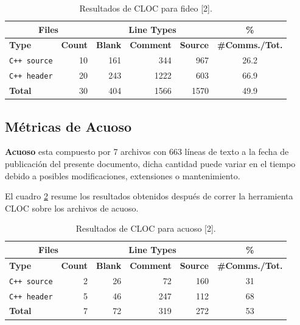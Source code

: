 \begin{table}[!htf]
    \begin{center}
    \begin{tabular}{|l|r|r|r|r|c|}
    \hline
    \multicolumn{2}{|c|}{Files} & \multicolumn{3}{|c|}{Line Types} & \hspace{0.2cm}\% \\
    \hline
    \textbf{Type} & \textbf{Count} & \textbf{Blank} & \textbf{Comment} & \textbf{Source} & \small{\textbf{\#Comms./Tot.}}\\
    \hline
    \texttt{C++ source} & 10   &    161  &     344   &    967 & 26.2 \\
    \hline
    \texttt{C++ header} & 20   &    243  &    1222   &    603 & 66.9 \\
    \hline
    \textbf{Total}      &  30  &     404 &     1566  &    1570 & 49.9 \\
    \hline
    \end{tabular}
    \caption{Resultados de CLOC para fideo [2].}
    \label{clocFideo}
    \end{center}
\end{table}

\subsection{Métricas de Acuoso}
\par \textbf{Acuoso} esta compuesto por 7 archivos con 663 líneas de texto a la fecha de publicación del presente documento, dicha cantidad puede variar en el tiempo debido a posibles modificaciones, extensiones o mantenimiento.

\par El cuadro \ref{clocAcuoso} resume los resultados obtenidos después de correr la herramienta CLOC sobre los archivos de acuoso.

\begin{table}[!htf]
    \begin{center}
    \begin{tabular}{|l|r|r|r|r|c|}
    \hline
    \multicolumn{2}{|c|}{Files} & \multicolumn{3}{|c|}{Line Types} & \hspace{0.2cm}\% \\
    \hline
    \textbf{Type} & \textbf{Count} & \textbf{Blank} & \textbf{Comment} & \textbf{Source} & \small{\textbf{\#Comms./Tot.}}\\
    \hline
    \texttt{C++ source} & 2 & 26 & 72 & 160 & 31 \\
    \hline
    \texttt{C++ header} & 5 & 46 & 247 & 112 & 68 \\
    \hline
    \textbf{Total}      & 7 & 72 & 319 & 272 & 53 \\
    \hline
    \end{tabular}
    \caption{Resultados de CLOC para acuoso [2].}
    \label{clocAcuoso}
    \end{center}
\end{table}

